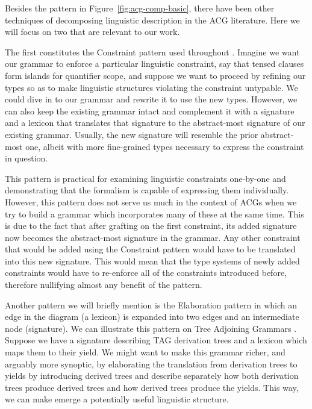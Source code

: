 \documentclass{llncs}
\begin{document}
Besides the pattern in Figure~\ref{fig:acg-comp-basic}, there have been other
techniques of decomposing linguistic description in the ACG literature. Here
we will focus on two that are relevant to our work.

The first constitutes the Constraint pattern used throughout
\cite{pogodalla2012controlling}. Imagine we want our grammar to enforce a
particular linguistic constraint, say that tensed clauses form islands for
quantifier scope, and suppose we want to proceed by refining our types so as
to make linguistic structures violating the constraint untypable. We could
dive in to our grammar and rewrite it to use the new types. However, we can
also keep the existing grammar intact and complement it with a signature and a
lexicon that translates that signature to the abstract-most signature of our
existing grammar. Usually, the new signature will resemble the prior
abstract-most one, albeit with more fine-grained types necessary to express
the constraint in question.

This pattern is practical for examining linguistic constraints one-by-one and
demonstrating that the formalism is capable of expressing them
individually. However, this pattern does not serve us much in the context of
ACGs when we try to build a grammar which incorporates many of these at the
same time. This is due to the fact that after grafting on the first
constraint, its added signature now becomes the abstract-most signature in the
grammar. Any other constraint that would be added using the Constraint pattern
would have to be translated into this new signature. This would mean that the
type systems of newly added constraints would have to re-enforce all of the
constraints introduced before, therefore nullifying almost any benefit of the
pattern.

Another pattern we will briefly mention is the Elaboration pattern in which an
edge in the diagram (a lexicon) is expanded into two edges and an intermediate
node (signature). We can illustrate this pattern on Tree Adjoining Grammars
\cite{degroote02}. Suppose we have a signature describing TAG derivation trees
and a lexicon which maps them to their yield. We might want to make this
grammar richer, and arguably more synoptic, by elaborating the translation
from derivation trees to yields by introducing derived trees and describe
separately how both derivation trees produce derived trees and how derived
trees produce the yields. This way, we can make emerge a potentially useful
linguistic structure.
\end{document}
